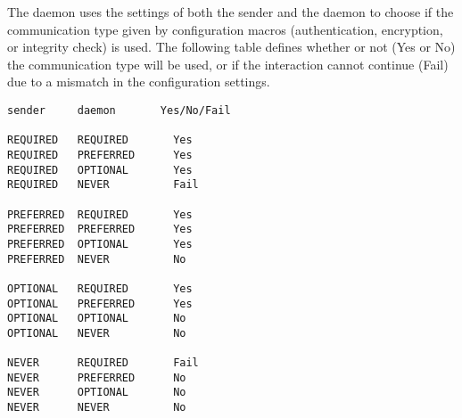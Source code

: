The daemon uses the settings of both the sender and the daemon
to choose if the communication type given by configuration
macros (authentication, encryption, or integrity check) is used.
The following table  defines whether or not (Yes or No) the
communication type will be used, or if the interaction cannot
continue (Fail) due to a mismatch in the configuration settings.

\begin{verbatim}
sender     daemon       Yes/No/Fail

REQUIRED   REQUIRED       Yes
REQUIRED   PREFERRED      Yes
REQUIRED   OPTIONAL       Yes
REQUIRED   NEVER          Fail

PREFERRED  REQUIRED       Yes
PREFERRED  PREFERRED      Yes
PREFERRED  OPTIONAL       Yes
PREFERRED  NEVER          No

OPTIONAL   REQUIRED       Yes
OPTIONAL   PREFERRED      Yes
OPTIONAL   OPTIONAL       No
OPTIONAL   NEVER          No

NEVER      REQUIRED       Fail
NEVER      PREFERRED      No
NEVER      OPTIONAL       No
NEVER      NEVER          No
\end{verbatim}











